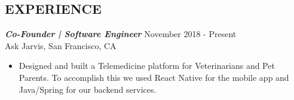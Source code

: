 \documentclass[overlapped, 10pt]{res} %
\begin{document}
\begin{resume}

 



\section{EXPERIENCE}\smallskip 



{\sl \textbf{Co-Founder | Software Engineer}} \hfill November 2018 - Present \\
Ask Jarvis, San Francisco, CA
\begin{itemize} \itemsep -1pt %
\item Designed and built a Telemedicine platform for Veterinarians and Pet Parents. To accomplish this we used React Native for the mobile app and Java/Spring for our backend services.
\end{itemize}


\end{resume}
\end{document}
